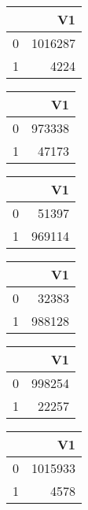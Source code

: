 \bigskip\bigskip
\centering
\begin{tabular}{rr}
  \hline
 & V1 \\ 
  \hline
0 & 1016287 \\ 
  1 & 4224 \\ 
   \hline
\end{tabular}

\bigskip\bigskip
\centering
\begin{tabular}{rr}
  \hline
 & V1 \\ 
  \hline
0 & 973338 \\ 
  1 & 47173 \\ 
   \hline
\end{tabular}

\bigskip\bigskip
\centering
\begin{tabular}{rr}
  \hline
 & V1 \\ 
  \hline
0 & 51397 \\ 
  1 & 969114 \\ 
   \hline
\end{tabular}

\bigskip\bigskip
\centering
\begin{tabular}{rr}
  \hline
 & V1 \\ 
  \hline
0 & 32383 \\ 
  1 & 988128 \\ 
   \hline
\end{tabular}

\bigskip\bigskip
\centering
\begin{tabular}{rr}
  \hline
 & V1 \\ 
  \hline
0 & 998254 \\ 
  1 & 22257 \\ 
   \hline
\end{tabular}

\bigskip\bigskip
\centering
\begin{tabular}{rr}
  \hline
 & V1 \\ 
  \hline
0 & 1015933 \\ 
  1 & 4578 \\ 
   \hline
\end{tabular}

